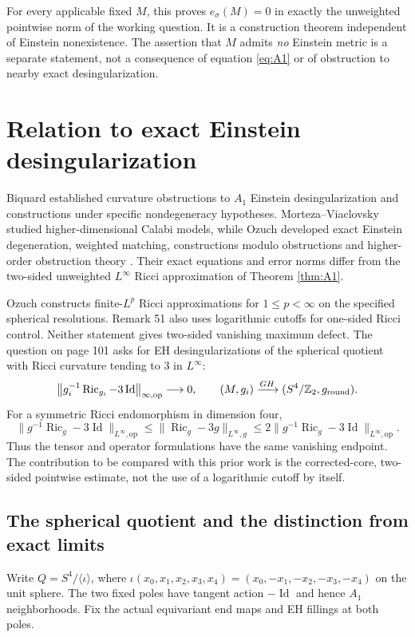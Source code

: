 \documentclass[a4paper,11pt]{article}
\numberwithin{equation}{section}
\theoremstyle{definition}
\newcommand{\Ric}{\operatorname{Ric}}
\newcommand{\Id}{\operatorname{Id}}
\newcommand{\op}{\mathrm{op}}
\newcommand{\Z}{\mathbb Z}
\newcommand{\norm}[1]{\left\lVert#1\right\rVert}
\begin{document}
For every applicable fixed $M$, this proves $e_\sigma(M)=0$ in exactly the unweighted pointwise norm of the working question. It is a construction theorem independent of Einstein nonexistence. The assertion that $M$ admits \emph{no} Einstein metric is a separate statement, not a consequence of equation \eqref{eq:A1} or of obstruction to nearby exact desingularization.

\section{Relation to exact Einstein desingularization}\label{sec:exact-desingularization}
Biquard established curvature obstructions to $A_1$ Einstein desingularization and constructions under specific nondegeneracy hypotheses. Morteza--Viaclovsky studied higher-dimensional Calabi models, while Ozuch developed exact Einstein degeneration, weighted matching, constructions modulo obstructions and higher-order obstruction theory \cite{Biquard,MV,OzuchI,OzuchII,OzuchHigher,OzuchIntegrability}. Their exact equations and error norms differ from the two-sided unweighted $L^\infty$ Ricci approximation of Theorem \ref{thm:A1}.

Ozuch \cite[Corollary 15 and \S7.3]{OzuchII} constructs finite-$L^p$ Ricci approximations for $1\le p<\infty$ on the specified spherical resolutions. Remark 51 also uses logarithmic cutoffs for one-sided Ricci control. Neither statement gives two-sided vanishing maximum defect. The question on page 101 asks for EH desingularizations of the spherical quotient with Ricci curvature tending to $3$ in $L^\infty$:
\begin{equation}\label{eq:football}
\norm{g_i^{-1}\Ric_{g_i}-3\Id}_{\infty,\op}\longrightarrow0,
\qquad (M,g_i)\xrightarrow{GH}(S^4/\Z_2,g_{\rm round}).
\end{equation}
For a symmetric Ricci endomorphism in dimension four,
\[
\|g^{-1}\Ric_g-3\Id\|_{L^\infty,\op}
\le\|\Ric_g-3g\|_{L^\infty,g}
\le2\|g^{-1}\Ric_g-3\Id\|_{L^\infty,\op}.
\]
Thus the tensor and operator formulations have the same vanishing endpoint.
The contribution to be compared with this prior work is the corrected-core,
two-sided pointwise estimate, not the use of a logarithmic cutoff by itself.

\subsection{The spherical quotient and the distinction from exact limits}\label{sec:football-comparison}
Write $Q=S^4/\langle\iota\rangle$, where
$\iota(x_0,x_1,x_2,x_3,x_4)=(x_0,-x_1,-x_2,-x_3,-x_4)$ on the unit sphere.
The two fixed poles have tangent action $-\Id$ and hence $A_1$ neighborhoods.
Fix the actual equivariant end maps and EH fillings at both poles.
\end{document}
